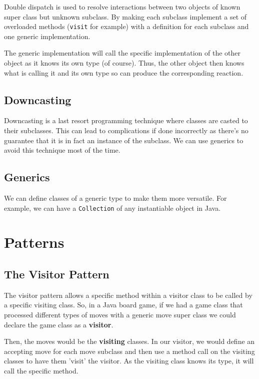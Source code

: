 \documentclass[a4paper, 12pt, twoside]{article}
\begin{document}
Double dispatch is used to resolve interactions between two objects
of known super class but unknown subclass. By making each subclass
implement a set of overloaded methods (\texttt{visit} for example)
with a definition for each subclass and one generic implementation.

\vspace{\baselineskip}

The generic implementation will call the specific implementation of
the other object as it knows its own type (of course). Thus,
the other object then knows what is calling it and its own type
so can produce the corresponding reaction.

\subsection{Downcasting}

Downcasting is a last resort programming technique where classes
are casted to their subclasses. This can lead to complications if
done incorrectly as there's no guarantee that it is in fact
an instance of the subclass. We can use generics to avoid this
technique most of the time.

\subsection{Generics}

We can define classes of a generic type to make them more versatile.
For example, we can have a \texttt{Collection} of any instantiable
object in Java.

\section{Patterns}

\subsection{The Visitor Pattern}

The visitor pattern allows a specific method within a visitor class
to be called by a specific visiting class. So, in a Java board game, 
if we had a game class that processed different types of moves
with a generic move super class we could declare the game class
as a \textbf{visitor}.

\vspace{\baselineskip}

Then, the moves would be the \textbf{visiting} classes. In our
visitor, we would define an accepting move for each move subclass
and then use a method call on the visiting classes to have them
'visit' the visitor. As the visiting class knows its type, it will
call the specific method.
\end{document}
